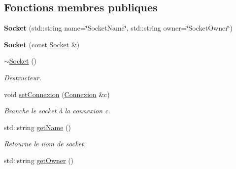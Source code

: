 \subsection*{Fonctions membres publiques}
\begin{DoxyCompactItemize}
\item 
\hypertarget{classSocket_a0365662f7a20fa1cc6ef54fd2a659cfc}{{\bfseries Socket} (std\-::string name=\char`\"{}Socket\-Name\char`\"{}, std\-::string owner=\char`\"{}Socket\-Owner\char`\"{})}\label{classSocket_a0365662f7a20fa1cc6ef54fd2a659cfc}

\item 
\hypertarget{classSocket_a0dd97f1387c3bd8008cb7de47583a985}{{\bfseries Socket} (const \hyperlink{classSocket}{Socket} \&)}\label{classSocket_a0dd97f1387c3bd8008cb7de47583a985}

\item 
\hypertarget{classSocket_aeac4eb6379a543d38ed88977d3b6630a}{\hyperlink{classSocket_aeac4eb6379a543d38ed88977d3b6630a}{$\sim$\-Socket} ()}\label{classSocket_aeac4eb6379a543d38ed88977d3b6630a}

\begin{DoxyCompactList}\small\item\em Destructeur. \end{DoxyCompactList}\item 
\hypertarget{classSocket_a96d104e32d5f376796fb411874954e7d}{void \hyperlink{classSocket_a96d104e32d5f376796fb411874954e7d}{set\-Connexion} (\hyperlink{classConnexion}{Connexion} \&c)}\label{classSocket_a96d104e32d5f376796fb411874954e7d}

\begin{DoxyCompactList}\small\item\em Branche le socket à la connexion c. \end{DoxyCompactList}\item 
\hypertarget{classSocket_aaefa10006cbf7a7a082e4adc606b3cea}{std\-::string \hyperlink{classSocket_aaefa10006cbf7a7a082e4adc606b3cea}{get\-Name} ()}\label{classSocket_aaefa10006cbf7a7a082e4adc606b3cea}

\begin{DoxyCompactList}\small\item\em Retourne le nom de socket. \end{DoxyCompactList}\item 
\hypertarget{classSocket_a6421574ae64f7b40e7c3f7bbb5cc3cee}{std\-::string \hyperlink{classSocket_a6421574ae64f7b40e7c3f7bbb5cc3cee}{get\-Owner} ()}\label{classSocket_a6421574ae64f7b40e7c3f7bbb5cc3cee}


\end{DoxyCompactItemize}
